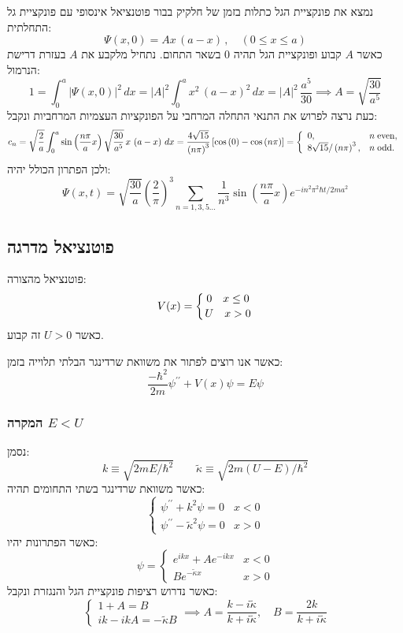 \documentclass{tstextbook}
\begin{document}
\begin{example}
נמצא את פונקציית הגל כתלות בזמן של חלקיק בבור פוטנציאל אינסופי עם פונקציית גל התחלתית:
$$\Psi(x,0)=A x\,(a-x)\,,\quad(0\le x\le a)$$
כאשר \(A\) קבוע ופונקציית הגל תהיה 0 בשאר התחום.
נתחיל מלקבע את \(A\) בעזרת דרישת הנרמול:
$$1=\int_{0}^{a}|\Psi(x,0)|^{2}\,d x=|A|^{2}\int_{0}^{a}x^{2}\,(a-x)^{2}\,d x=|A|^{2}\,{\frac{a^{5}}{30}}\implies A=\sqrt{ \frac{30}{a^{5}} }$$
כעת נרצה לפרוש את התנאי התחלה המרחבי על הפונקציות העצמיות המרחביות ונקבל:
$$\begin{gather}c_{n}=\sqrt{\frac{2}{a}}\int_{0}^{a}\sin\left(\frac{n\pi}{a}x\right)\sqrt{\frac{30}{a^{5}}}\,x\,\left(a-x\right)\,d x =\frac{4\sqrt{15}}{\left(n\pi\right)^{3}}\left[\cos\left(0\right)-\cos\left(n\pi\right)\right]=\left\{\begin{array}{l l}{{0,}}&{{n\;\mathrm{even},}}\\ {{8\sqrt{15}/\left(n\pi\right)^{3},}}&{{n\;\mathrm{odd}.}}\end{array}\right.
\end{gather}$$
ולכן הפתרון הכולל יהיה:
$$\Psi(x,t)={\sqrt{\frac{30}{a}}}\left({\frac{2}{\pi}}\right)^{3}\sum_{n=1,3,5\ldots}{\frac{1}{n^{3}}}\sin\left({\frac{n\pi}{a}}x\right)e^{-i n^{2}\pi^{2}\hbar t/2m a^{2}}$$

\end{example}
\subsection{פוטנציאל מדרגה}

\begin{definition}
פוטנציאל מהצורה:
$$V(x)=\left\{{0\quad x\leq0}\atop{U\quad x>0}\right.$$
כאשר \(U>0\) זה קבוע.

\end{definition}
כאשר אנו רוצים לפתור את משוואת שרדינגר הבלתי תלוייה בזמן:
$${\frac{-\hbar^{2}}{2m}}\psi^{\prime\prime}+V(x)\psi=E\psi$$

\subsubsection{המקרה \(E<U\)}

נסמן:
$$k\equiv\sqrt{2m E/\hbar^{2}} \qquad \tilde{\kappa}\equiv\sqrt{2m(U-E)/\hbar^{2}}$$
כאשר משוואת שרדינגר בשתי התחומים תהיה:
$$\begin{cases}\psi^{\prime\prime}+k^{2}\psi=0 &x<0 \\\psi^{\prime\prime}-\tilde{\kappa}^{2}\psi=0 &x>0
\end{cases}$$
כאשר הפתרונות יהיו:
$$\psi=\begin{cases}e^{ ikx }+Ae^{ -ikx } & x<0 \\Be^{ -\tilde{\kappa}x } & x>0
\end{cases}$$
כאשר נדרוש רציפות פונקציית הגל והנגזרת ונקבל:
$$\begin{cases}1+A=B \\ik-ikA=-\tilde{\kappa}B
\end{cases}\implies A=\frac{k-i\tilde{\kappa}}{k+i\tilde{\kappa}},\quad B=\frac{2k}{k+i\tilde{\kappa}}$$
\end{document}
